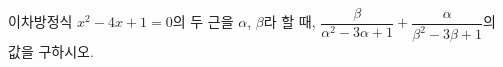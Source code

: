 이차방정식 $x^2-4x+1=0$의 두 근을 $\alpha$, $\beta$라 할 때, $\dfrac{\beta}{\alpha^2-3\alpha+1}+\dfrac{\alpha}{\beta^2-3\beta+1}$의 값을 구하시오.
